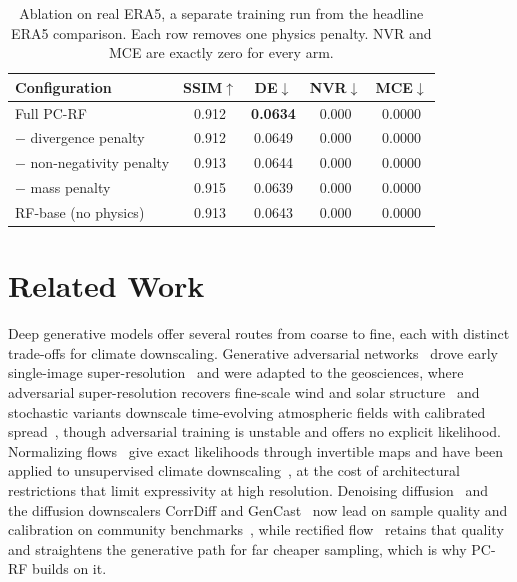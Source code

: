 \documentclass[letterpaper,withtimes]{easychair}
\newcommand{\pcrf}{\textsc{PC-RF}\xspace}
\begin{document}
\begin{table}[t]
\caption{Ablation on real ERA5, a separate training run from the headline ERA5 comparison. Each row removes one physics penalty. NVR and MCE are exactly zero for every arm.}
\label{tab:ablation}
\centering
\small
\begin{tabular}{lcccc}
\toprule
\textbf{Configuration} & SSIM$\uparrow$ & DE$\downarrow$ & NVR$\downarrow$ & MCE$\downarrow$ \\
\midrule
Full \pcrf                  & 0.912 & \textbf{0.0634} & 0.000 & 0.0000 \\
$-$ divergence penalty      & 0.912 & 0.0649          & 0.000 & 0.0000 \\
$-$ non-negativity penalty  & 0.913 & 0.0644          & 0.000 & 0.0000 \\
$-$ mass penalty            & 0.915 & 0.0639          & 0.000 & 0.0000 \\
RF-base (no physics)        & 0.913 & 0.0643          & 0.000 & 0.0000 \\
\bottomrule
\end{tabular}
\end{table}

\section{Related Work}
\label{sec:related}
Deep generative models offer several routes from coarse to fine, each with distinct trade-offs for climate downscaling. Generative adversarial networks~\citep{goodfellow2014generative} drove early single-image super-resolution~\citep{ledig2017photo,dong2015image} and were adapted to the geosciences, where adversarial super-resolution recovers fine-scale wind and solar structure~\citep{stengel2020adversarial} and stochastic variants downscale time-evolving atmospheric fields with calibrated spread~\citep{leinonen2021stochastic}, though adversarial training is unstable and offers no explicit likelihood. Normalizing flows~\citep{rezende2015variational,dinh2017density,kingma2018glow} give exact likelihoods through invertible maps and have been applied to unsupervised climate downscaling~\citep{groenke2020climalign}, at the cost of architectural restrictions that limit expressivity at high resolution. Denoising diffusion~\citep{ho2020denoising,song2021score} and the diffusion downscalers CorrDiff and GenCast~\citep{mardani2023residual,price2023gencast} now lead on sample quality and calibration on community benchmarks~\citep{rasp2024weatherbench}, while rectified flow~\citep{liu2022flow,lipman2022flow} retains that quality and straightens the generative path for far cheaper sampling, which is why \pcrf builds on it.
\end{document}
